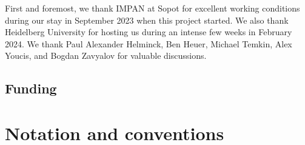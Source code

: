 First and foremost, we thank IMPAN at Sopot for excellent working conditions during our stay in September 2023 when this project started. We also thank Heidelberg University for hosting us during an intense few weeks in February 2024. We thank Paul Alexander Helminck, Ben Heuer, Michael Temkin, Alex Youcis, and Bogdan Zavyalov for valuable discussions.


\subsection*{Funding}

\grants 


\section*{Notation and conventions}



